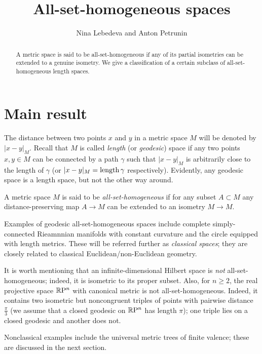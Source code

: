 \documentclass[a4paper,10pt]{article}
\def\thetitle{All-set-homogeneous spaces}
\def\theauthors{Nina Lebedeva and Anton Petrunin}
\begin{document}


\title{\thetitle}
\author{\theauthors}
\date{}
\maketitle

\begin{abstract}
A metric space is said to be all-set-homogeneous if any of its partial isometries can be extended to a genuine isometry.
We give a classification of a certain subclass of all-set-homogeneous length spaces.
\end{abstract}

\section{Main result}

The distance between two points $x$ and $y$ in a metric space $M$ will be denoted by $|x-y|_M$.
Recall that $M$ is called \emph{length} (or \emph{geodesic}) space if any two points $x,y\in M$ can be connected by a path $\gamma$ 
such that $|x-y|_M$ is arbitrarily close to the length of $\gamma$ (or $|x-y|_M=\mathop{\rm length}\nolimits\gamma$ respectively).
Evidently, any geodesic space is a length space, but not the other way around.

A metric space $M$ is said to be \emph{all-set-homogeneous} if for any subset $A\subset M$ any distance-preserving map $A\to M$ can be extended to an isometry $M\to M$.

Examples of geodesic all-set-homogeneous spaces include complete simply-connected Rieamnnian manifolds with constant curvature and the circle equipped with length metrics.
These will be referred further as \emph{classical spaces};
they are closely related to classical Euclidean/non-Euclidean geometry.

It is worth mentioning that an infinite-dimensional Hilbert space is \emph{not} all-set-homogeneous;
indeed, it is isometric to its proper subset.
Also, for $n\ge2$, the real projective space $\mathbb{R}\mathrm{P}^n$ with canonical metric is not all-set-homogeneous.
Indeed, it contains two isometric but noncongruent triples of points with pairwise distance $\tfrac\pi3$
(we assume that a closed geodesic on $\mathbb{R}\mathrm{P}^n$ has length $\pi$);
one triple lies on a closed geodesic and another does not. 

Nonclassical examples include the universal metric trees of finite valence;
these are discussed in the next section.
\end{document}
